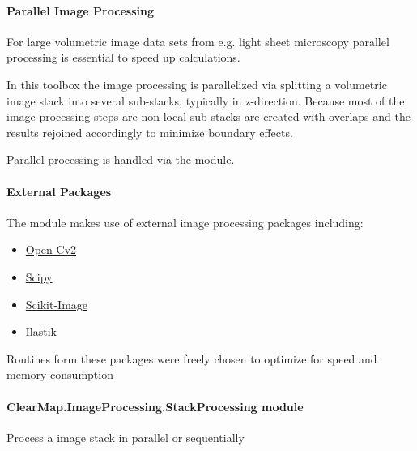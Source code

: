 \documentclass[letterpaper,10pt,english]{sphinxmanual}
\begin{document}
\paragraph{Parallel Image Processing}
\label{api/ClearMap.ImageProcessing:parallel-image-processing}
For large volumetric image data sets from e.g. light sheet microscopy
parallel processing is essential to speed up calculations.

In this toolbox the image processing is parallelized via splitting a volumetric
image stack into several sub-stacks, typically in z-direction. Because most of
the image processing steps are non-local sub-stacks are created with overlaps
and the results rejoined accordingly to minimize boundary effects.

Parallel processing is handled via the
{\hyperref[api/ClearMap.ImageProcessing:module-ClearMap.ImageProcessing.StackProcessing]{\emph{}}} module.


\paragraph{External Packages}
\label{api/ClearMap.ImageProcessing:external-packages}
The {\hyperref[api/ClearMap.ImageProcessing:module-ClearMap.ImageProcessing]{\emph{}}} module makes use of external image
processing packages including:
\begin{itemize}
\item {} 
\href{http://opencv.org/}{Open Cv2}

\item {} 
\href{http://www.scipy.org/}{Scipy}

\item {} 
\href{http://scikit-image.org/docs/dev/api/skimage.html}{Scikit-Image}

\item {} 
\href{http://ilastik.org/}{Ilastik}

\end{itemize}

Routines form these packages were freely chosen to optimize for speed and
memory consumption


\paragraph{ClearMap.ImageProcessing.StackProcessing module}
\label{api/ClearMap.ImageProcessing:clearmap-imageprocessing-stackprocessing-module}\label{api/ClearMap.ImageProcessing:module-ClearMap.ImageProcessing.StackProcessing}
Process a image stack in parallel or sequentially
\end{document}
